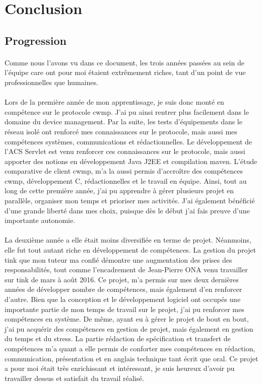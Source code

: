 \documentclass[12pt,a4paper]{report}
\begin{document}
\newpage
\section{Conclusion}
\subsection{Progression}
\paragraph*{}Comme nous l'avons vu dans ce document, les trois années passées au sein de l'équipe \gls{care} ont pour moi étaient extrêmement riches, tant d'un point de vue professionnelles que humaines. 
\paragraph*{}Lors de la première année de mon apprentissage, je suis donc monté en compétence sur le protocole \gls{cwmp}. J'ai pu ainsi rentrer plus facilement dans le domaine du device management. Par la suite, les tests d'équipements dans le réseau isolé ont renforcé mes connaissances sur le protocole, mais aussi mes compétences systèmes, communications et rédactionnelles. Le développement de l'ACS Servlet est venu renforcer ces connaissances sur le protocole, mais aussi apporter des notions en développement Java J2EE et compilation maven. L'étude comparative de client \gls{cwmp}, m'a la aussi permis d'accroître des compétences \gls{cwmp}, développement C, rédactionnelles et le travail en équipe. Ainsi, tout au long de cette première année, j'ai pu apprendre à gérer plusieurs projet en parallèle, organiser mon temps et prioriser mes activités. J'ai également bénéficié d'une grande liberté dans mes choix, puisque dès le début j'ai fais preuve d'une importante autonomie. 
\paragraph*{}La deuxième année a elle était moins diversifiée en terme de projet. Néanmoins, elle fut tout autant riche en développement de compétences. La gestion du projet \gls{tink} que mon tuteur ma confié démontre une augmentation des prises des responsabilités, tout comme l'encadrement de Jean-Pierre ONA venu travailler sur \gls{tink} de mars à août 2016. Ce projet, m'a permis sur mes deux dernières années de développer nombre de compétences, mais également d'en renforcer d'autre. Bien que la conception et le développement logiciel ont occupés une importante partie de mon temps de travail sur le projet, j'ai pu renforcer mes compétences en système. De même, ayant eu à gérer le projet de bout en bout, j'ai pu acquérir des compétences en gestion de projet, mais également en gestion du temps et du stress. La partie rédaction de spécification et transfert de compétences m'a quant a elle permis de conforter mes compétences en rédaction, communication, présentation et en anglais technique tant écrit que oral. Ce projet a pour moi était très enrichissant et intéressant, je suis heureux d'avoir pu travailler dessus et satisfait du travail réalisé.
\end{document}
